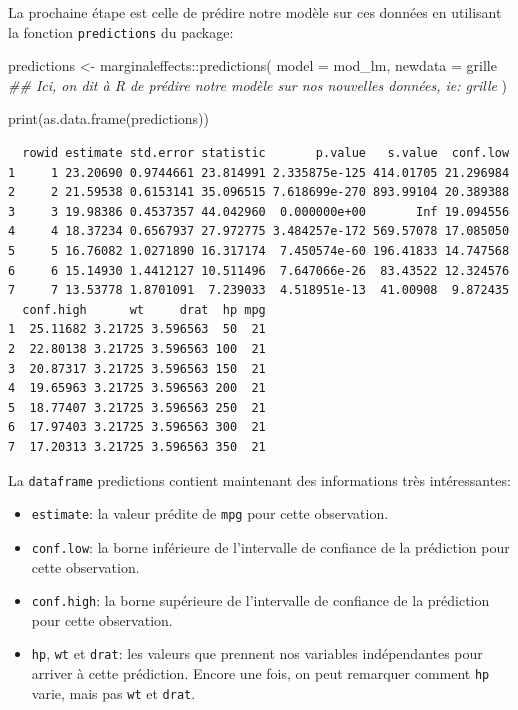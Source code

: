 \documentclass[
  letterpaper,
  DIV=11,
  numbers=noendperiod]{scrreprt}
\newenvironment{Shaded}{\begin{snugshade}}{\end{snugshade}}
\newcommand{\AttributeTok}[1]{\textcolor[rgb]{0.40,0.45,0.13}{#1}}
\newcommand{\DocumentationTok}[1]{\textcolor[rgb]{0.37,0.37,0.37}{\textit{#1}}}
\newcommand{\FunctionTok}[1]{\textcolor[rgb]{0.28,0.35,0.67}{#1}}
\newcommand{\NormalTok}[1]{\textcolor[rgb]{0.00,0.23,0.31}{#1}}
\newcommand{\OtherTok}[1]{\textcolor[rgb]{0.00,0.23,0.31}{#1}}
\newcommand{\SpecialCharTok}[1]{\textcolor[rgb]{0.37,0.37,0.37}{#1}}
\providecommand{\tightlist}{%
  \setlength{\itemsep}{0pt}\setlength{\parskip}{0pt}}\usepackage{longtable,booktabs,array}
\begin{document}
La prochaine étape est celle de prédire notre modèle sur ces données en
utilisant la fonction \texttt{predictions} du package:

\begin{Shaded}
\begin{Highlighting}[]
\NormalTok{predictions }\OtherTok{\textless{}{-}}\NormalTok{ marginaleffects}\SpecialCharTok{::}\FunctionTok{predictions}\NormalTok{(}
      \AttributeTok{model =}\NormalTok{ mod\_lm,}
      \AttributeTok{newdata =}\NormalTok{ grille }\DocumentationTok{\#\# Ici, on dit à R de prédire notre modèle sur nos nouvelles données, ie: grille}
\NormalTok{)}

\FunctionTok{print}\NormalTok{(}\FunctionTok{as.data.frame}\NormalTok{(predictions))}
\end{Highlighting}
\end{Shaded}

\begin{verbatim}
  rowid estimate std.error statistic       p.value   s.value  conf.low
1     1 23.20690 0.9744661 23.814991 2.335875e-125 414.01705 21.296984
2     2 21.59538 0.6153141 35.096515 7.618699e-270 893.99104 20.389388
3     3 19.98386 0.4537357 44.042960  0.000000e+00       Inf 19.094556
4     4 18.37234 0.6567937 27.972775 3.484257e-172 569.57078 17.085050
5     5 16.76082 1.0271890 16.317174  7.450574e-60 196.41833 14.747568
6     6 15.14930 1.4412127 10.511496  7.647066e-26  83.43522 12.324576
7     7 13.53778 1.8701091  7.239033  4.518951e-13  41.00908  9.872435
  conf.high      wt     drat  hp mpg
1  25.11682 3.21725 3.596563  50  21
2  22.80138 3.21725 3.596563 100  21
3  20.87317 3.21725 3.596563 150  21
4  19.65963 3.21725 3.596563 200  21
5  18.77407 3.21725 3.596563 250  21
6  17.97403 3.21725 3.596563 300  21
7  17.20313 3.21725 3.596563 350  21
\end{verbatim}

La \texttt{dataframe} predictions contient maintenant des informations
très intéressantes:

\begin{itemize}
\tightlist
\item
  \texttt{estimate}: la valeur prédite de \texttt{mpg} pour cette
  observation.
\item
  \texttt{conf.low}: la borne inférieure de l'intervalle de confiance de
  la prédiction pour cette observation.
\item
  \texttt{conf.high}: la borne supérieure de l'intervalle de confiance
  de la prédiction pour cette observation.
\item
  \texttt{hp}, \texttt{wt} et \texttt{drat}: les valeurs que prennent
  nos variables indépendantes pour arriver à cette prédiction. Encore
  une fois, on peut remarquer comment \texttt{hp} varie, mais pas
  \texttt{wt} et \texttt{drat}.
\end{itemize}
\end{document}
